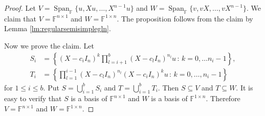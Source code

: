 \documentclass[12pt]{amsart}
\theoremstyle{definition}
\theoremstyle{remark}\newtheorem{rmk}[lm]{Remark}
\newcommand{\Span}{\operatorname{Span}}
\newcommand{\C}{\mathbb{F}}
\renewcommand{\mid}{\,:\,}
\begin{document}
	\begin{proof}
		Let $V=\Span_{\C}\{u,Xu,\dots,X^{n-1}u\}$ and $W=\Span_{\C}\{v,vX,\dots,vX^{n-1}\}$. We claim that $V=\C^{n\times 1}$ and $W=\C^{1\times n}$. The proposition follows from the claim by Lemma \ref{lm:regularsemisimplegln}.
		
		Now we prove the claim. Let
		\begin{align*}
			S_i&=\left\{(X-c_iI_n)^k\prod_{l=i+1}^b(X-c_lI_n)^{n_l}u\mid k=0,\dots n_i-1\right\},\\
			T_i&=\left\{\prod_{l=1}^{i-1}(X-c_lI_n)^{n_l}(X-c_iI_n)^ku\mid k=0,\dots,n_i-1\right\}
		\end{align*}
		for $1\leq i\leq b$. Put $S=\bigcup_{i=1}^bS_i$ and $T=\bigcup_{i=1}^bT_i$. Then $S\subseteq V$ and $T\subseteq W$. It is easy to verify that $S$ is a basis of $\C^{n\times 1}$ and $W$ is a basis of $\C^{1\times n}$. Therefore $V=\C^{n\times 1}$ and $W=\C^{1\times n}$.
	\end{proof}
\end{document}
